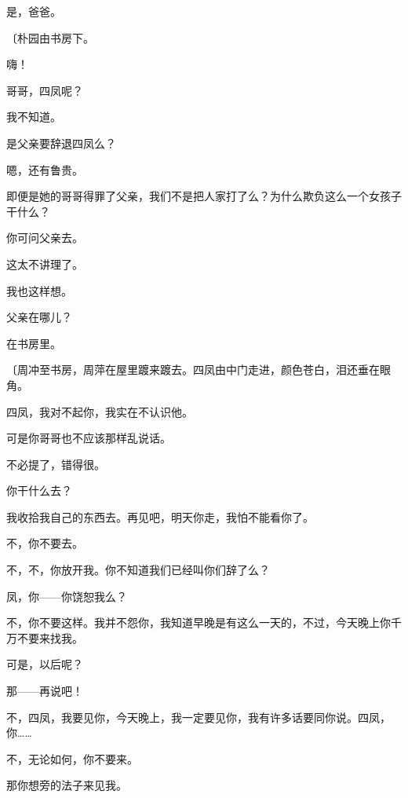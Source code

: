 是，爸爸。

{\fangsong〔朴园由书房下。}

嗨！

哥哥，四凤呢？

我不知道。

是父亲要辞退四凤么？

嗯，还有鲁贵。

即便是她的哥哥得罪了父亲，我们不是把人家打了么？为什么欺负这么一个女孩子干什么？

你可问父亲去。

这太不讲理了。

我也这样想。

父亲在哪儿？

在书房里。

{\fangsong〔周冲至书房，周萍在屋里踱来踱去。四凤由中门走进，颜色苍白，泪还垂在眼角。}

四凤，我对不起你，我实在不认识他。


可是你哥哥也不应该那样乱说话。

不必提了，错得很。

你干什么去？

我收拾我自己的东西去。再见吧，明天你走，我怕不能看你了。

不，你不要去。

不，不，你放开我。你不知道我们已经叫你们辞了么？

凤，你——你饶恕我么？

不，你不要这样。我并不怨你，我知道早晚是有这么一天的，不过，今天晚上你千万不要来找我。

可是，以后呢？

那——再说吧！

不，四凤，我要见你，今天晚上，我一定要见你，我有许多话要同你说。四凤，你……

不，无论如何，你不要来。

那你想旁的法子来见我。

